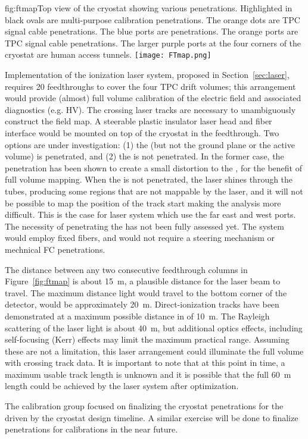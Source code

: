 
\begin{dunefigure}{fig:ftmap}{Top view of the  
cryostat showing various penetrations. Highlighted in black ovals are multi-purpose calibration penetrations. The orange dots are TPC signal cable penetrations. The blue ports are  penetrations. The orange ports are TPC signal cable penetrations. The larger purple ports at the four corners of the cryostat are human access tunnels.}
\texttt{[image: FTmap.png]}
\end{dunefigure}


Implementation of the ionization laser system, proposed in Section~\ref{sec:laser}, requires 20 feedthroughs to cover the four TPC drift volumes; this arrangement would provide (almost) full volume calibration of the electric field and associated diagnostics (e.g. HV). The crossing laser tracks are necessary to unambiguously construct the field map. A steerable plastic insulator laser head and fiber interface would be mounted on top of the cryostat in the feedthrough. Two options are under investigation: (1) the  (but not the ground plane or the active volume) is penetrated, and (2) the  is not penetrated. In the former case, the  penetration has been shown to create a small distortion to the \efield, for the benefit of full volume \efield mapping. When the  is not penetrated, the laser shines through the  tubes, producing some regions that are not mappable by the laser, and it will not be possible to map the position of the track start making the analysis more difficult. This is the case for laser system which use the far east and west ports. The necessity of penetrating the  has not been fully assessed yet. The \phel system would employ fixed fibers, and would not require a steering mechanism or mechnical FC penetrations.

The distance between any two consecutive feedthrough columns in Figure~\ref{fig:ftmap} is about \SI{15}{\m}, a plausible distance for the laser beam to travel. The maximum distance light would travel to the bottom corner of the detector, would be approximately \SI{20}{\m}.  Direct-ionization tracks have been demonstrated at a maximum possible distance in \microboone of \SI{10}{\m}. The Rayleigh scattering of the laser light is about \SI{40}{\m}, but additional optics effects, including self-focusing (Kerr) effects may limit the maximum practical range. Assuming these are not a limitation, this laser arrangement could illuminate the full volume with crossing track data. It is important to note that at this point in time, a maximum usable track length is unknown and it is possible that the full \SI{60}{\m} \detmodule length could be achieved by the laser system after optimization.

The calibration group focused on finalizing the cryostat penetrations for the \spmod driven by the cryostat design timeline. A similar exercise will be done to finalize \dpmod penetrations for calibrations in the near future.

